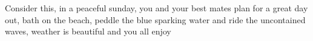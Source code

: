 Consider this, in a peaceful sunday, you and your best mates plan for a great day out, bath on the beach, peddle the blue sparking water and ride the uncontained waves, weather is beautiful and you all enjoy 